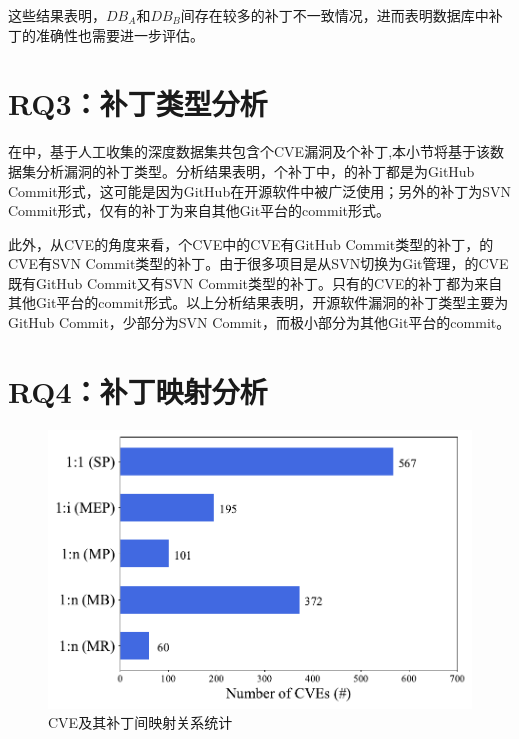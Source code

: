 这些结果表明，$DB_A$和$DB_B$间存在较多的补丁不一致情况，进而表明数据库中补丁的准确性也需要进一步评估。


\section{RQ3：补丁类型分析}\label{sec:type}

在中，基于人工收集的深度数据集共包含个CVE漏洞及个补丁,本小节将基于该数据集分析漏洞的补丁类型。分析结果表明，个补丁中，的补丁都是为GitHub Commit形式，这可能是因为GitHub在开源软件中被广泛使用；另外的补丁为SVN Commit形式，仅有的补丁为来自其他Git平台的commit形式。

此外，从CVE的角度来看，个CVE中的CVE有GitHub Commit类型的补丁，的CVE有SVN Commit类型的补丁。由于很多项目是从SVN切换为Git管理，的CVE既有GitHub Commit又有SVN Commit类型的补丁。只有的CVE的补丁都为来自其他Git平台的commit形式。以上分析结果表明，开源软件漏洞的补丁类型主要为GitHub Commit，少部分为SVN Commit，而极小部分为其他Git平台的commit。

\section{RQ4：补丁映射分析}\label{sec:cardinality}
\begin{figure}[h]
\centering
\includegraphics[scale=0.80]{fig/rq4-cardinality.pdf}
\vspace{-10pt}
\caption{CVE及其补丁间映射关系统计}\label{fig:rq4-cardinality}
\end{figure}

